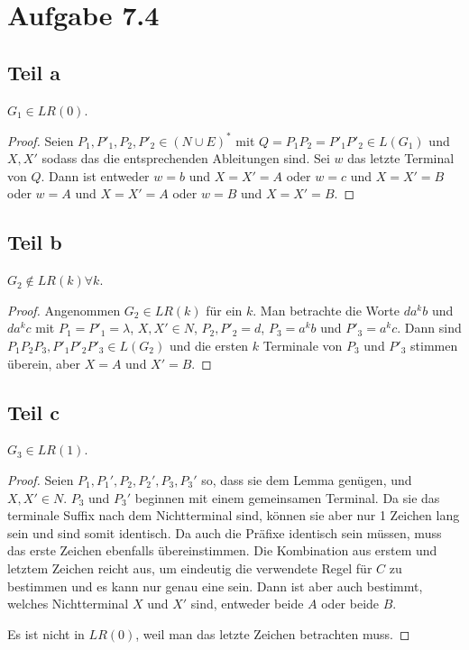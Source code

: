 \documentclass[10pt,a4paper]{article}
\begin{document}
\section{Aufgabe 7.4}

\subsection{Teil a}

$G_{1} \in LR(0)$.

\begin{proof}
  Seien $P_{1}, P'_{1}, P_{2}, P'_{2} \in (N \cup E)^{*}$ mit $Q = P_{1}P_{2} = P'_{1}P'_{2} \in L(G_{1})$ und $X, X'$ sodass das die entsprechenden Ableitungen sind.
  Sei $w$ das letzte Terminal von $Q$.
  Dann ist entweder $w = b$ und $X = X' = A$ oder $w = c$ und $X = X' = B$ oder $w = A$ und $X = X' = A$ oder $w = B$ und $X = X' = B$.
\end{proof}

\subsection{Teil b}

$G_{2} \not\in LR(k) \forall k$.

\begin{proof}
  Angenommen $G_{2} \in LR(k)$ für ein $k$.
  Man betrachte die Worte $da^{k}b$ und $da^{k}c$ mit $P_{1} = P'_{1} = \lambda$, $X, X' \in N$, $P_{2}, P'_{2} = d$, $P_{3} = a^{k}b$ und $P'_{3} = a^{k}c$.
  Dann sind $P_{1}P_{2}P_{3}, P'_{1}P'_{2}P'_{3} \in L(G_{2})$ und die ersten $k$ Terminale von $P_{3}$ und $P'_{3}$ stimmen überein, aber $X = A$ und $X' = B$.
\end{proof}

\subsection{Teil c}

$G_{3} \in LR(1)$.

\begin{proof}
  Seien $P_{1}, P_{1}', P_{2}, P_{2}', P_{3}, P_{3}'$ so, dass sie dem Lemma genügen, und $X, X' \in N$.
  $P_{3}$ und $P_{3}'$ beginnen mit einem gemeinsamen Terminal.
  Da sie das terminale Suffix nach dem Nichtterminal sind, können sie aber nur 1 Zeichen lang sein und sind somit identisch.
  Da auch die Präfixe identisch sein müssen, muss das erste Zeichen ebenfalls übereinstimmen.
  Die Kombination aus erstem und letztem Zeichen reicht aus, um eindeutig die verwendete Regel für $C$ zu bestimmen und es kann nur genau eine sein.
  Dann ist aber auch bestimmt, welches Nichtterminal $X$ und $X'$ sind, entweder beide $A$ oder beide $B$.

  Es ist nicht in $LR(0)$, weil man das letzte Zeichen betrachten muss.
\end{proof}
\end{document}
